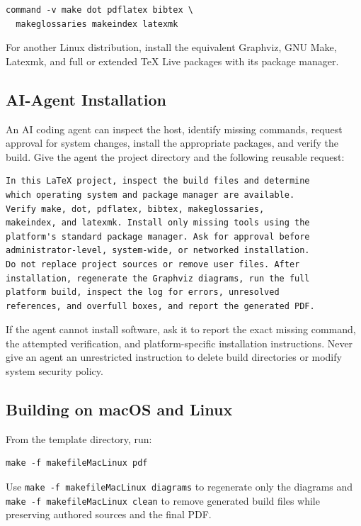 \begin{verbatim}
command -v make dot pdflatex bibtex \
  makeglossaries makeindex latexmk
\end{verbatim}

For another Linux distribution, install the equivalent Graphviz, GNU Make,
Latexmk, and full or extended TeX Live packages with its package manager.

\subsection{AI-Agent Installation}
\label{Section:AIAgentInstallation}

An AI coding agent can inspect the host, identify missing commands, request
approval for system changes, install the appropriate packages, and verify the
build. Give the agent the project directory and the following reusable request:

\begin{verbatim}
In this LaTeX project, inspect the build files and determine
which operating system and package manager are available.
Verify make, dot, pdflatex, bibtex, makeglossaries,
makeindex, and latexmk. Install only missing tools using the
platform's standard package manager. Ask for approval before
administrator-level, system-wide, or networked installation.
Do not replace project sources or remove user files. After
installation, regenerate the Graphviz diagrams, run the full
platform build, inspect the log for errors, unresolved
references, and overfull boxes, and report the generated PDF.
\end{verbatim}

If the agent cannot install software, ask it to report the exact missing
command, the attempted verification, and platform-specific installation
instructions. Never give an agent an unrestricted instruction to delete build
directories or modify system security policy.

\subsection{Building on macOS and Linux}

From the template directory, run:

\begin{verbatim}
make -f makefileMacLinux pdf
\end{verbatim}

Use \texttt{make -f makefileMacLinux diagrams} to regenerate only the diagrams and \texttt{make -f makefileMacLinux clean} to remove generated build files while preserving authored sources and the final PDF.

